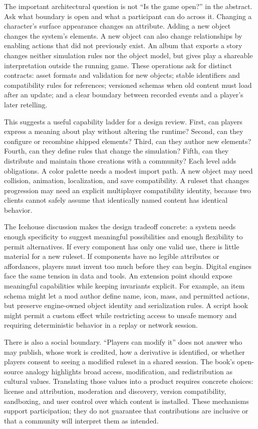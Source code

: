 The important architectural question is not ``Is the game open?'' in the abstract. Ask what boundary is open and what a participant can do across it. Changing a character's surface appearance changes an attribute. Adding a new object changes the system's elements. A new object can also change relationships by enabling actions that did not previously exist. An album that exports a story changes neither simulation rules nor the object model, but gives play a shareable interpretation outside the running game. These operations ask for distinct contracts: asset formats and validation for new objects; stable identifiers and compatibility rules for references; versioned schemas when old content must load after an update; and a clear boundary between recorded events and a player's later retelling.

This suggests a useful capability ladder for a design review. First, can players express a meaning about play without altering the runtime? Second, can they configure or recombine shipped elements? Third, can they author new elements? Fourth, can they define rules that change the simulation? Fifth, can they distribute and maintain those creations with a community? Each level adds obligations. A color palette needs a modest import path. A new object may need collision, animation, localization, and save compatibility. A ruleset that changes progression may need an explicit multiplayer compatibility identity, because two clients cannot safely assume that identically named content has identical behavior.

The Icehouse discussion makes the design tradeoff concrete: a system needs enough specificity to suggest meaningful possibilities and enough flexibility to permit alternatives. If every component has only one valid use, there is little material for a new ruleset. If components have no legible attributes or affordances, players must invent too much before they can begin. Digital engines face the same tension in data and tools. An extension point should expose meaningful capabilities while keeping invariants explicit. For example, an item schema might let a mod author define name, icon, mass, and permitted actions, but preserve engine-owned object identity and serialization rules. A script hook might permit a custom effect while restricting access to unsafe memory and requiring deterministic behavior in a replay or network session.

There is also a social boundary. ``Players can modify it'' does not answer who may publish, whose work is credited, how a derivative is identified, or whether players consent to seeing a modified ruleset in a shared session. The book's open-source analogy highlights broad access, modification, and redistribution as cultural values. Translating those values into a product requires concrete choices: license and attribution, moderation and discovery, version compatibility, sandboxing, and user control over which content is installed. These mechanisms support participation; they do not guarantee that contributions are inclusive or that a community will interpret them as intended.

